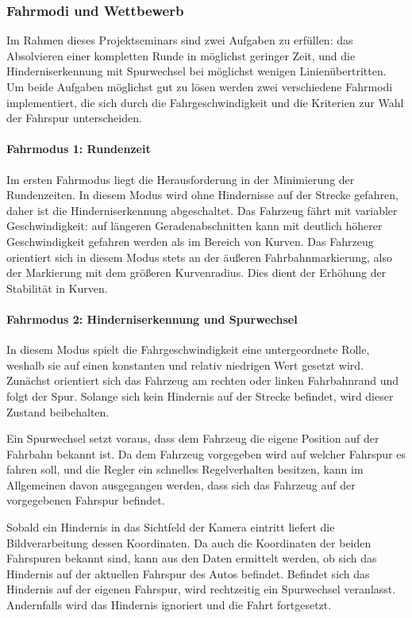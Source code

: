 \subsubsection{Fahrmodi und Wettbewerb}
\label{sec:fahrmodi}
Im Rahmen dieses Projektseminars sind zwei Aufgaben zu erfüllen: das Absolvieren einer kompletten Runde in möglichst geringer Zeit, und die Hinderniserkennung mit Spurwechsel bei möglichst wenigen Linienübertritten. Um beide Aufgaben möglichst gut zu lösen werden zwei verschiedene Fahrmodi implementiert, die sich durch die Fahrgeschwindigkeit und die Kriterien zur Wahl der Fahrspur unterscheiden.

\paragraph{Fahrmodus 1: Rundenzeit}

Im ersten Fahrmodus liegt die Herausforderung in der Minimierung der Rundenzeiten. In diesem Modus wird ohne Hindernisse auf der Strecke gefahren, daher ist die Hinderniserkennung abgeschaltet. Das Fahrzeug fährt mit variabler Geschwindigkeit: auf längeren Geradenabschnitten kann mit deutlich höherer Geschwindigkeit gefahren werden als im Bereich von Kurven. Das Fahrzeug orientiert sich in diesem Modus stets an der äußeren Fahrbahnmarkierung, also der Markierung mit dem größeren Kurvenradius. Dies dient der Erhöhung der Stabilität in Kurven.

\paragraph{Fahrmodus 2: Hinderniserkennung und Spurwechsel}

In diesem Modus spielt die Fahrgeschwindigkeit eine untergeordnete Rolle, weshalb sie auf einen konstanten und relativ niedrigen Wert gesetzt wird. Zunächst orientiert sich das Fahrzeug am rechten oder linken Fahrbahnrand und folgt der Spur. Solange sich kein Hindernis auf der Strecke befindet, wird dieser Zustand beibehalten. 

Ein Spurwechsel setzt voraus, dass dem Fahrzeug die eigene Position auf der Fahrbahn bekannt ist. Da dem Fahrzeug vorgegeben wird auf welcher Fahrspur es fahren soll, und die Regler ein schnelles Regelverhalten besitzen, kann im Allgemeinen davon ausgegangen werden, dass sich das Fahrzeug auf der vorgegebenen Fahrspur befindet.

Sobald ein Hindernis in das Sichtfeld der Kamera eintritt liefert die Bildverarbeitung dessen Koordinaten. Da auch die Koordinaten der beiden Fahrspuren bekannt sind, kann aus den Daten ermittelt werden, ob sich das Hindernis auf der aktuellen Fahrspur des Autos befindet. Befindet sich das Hindernis auf der eigenen Fahrspur, wird rechtzeitig ein Spurwechsel veranlasst. Andernfalls wird das Hindernis ignoriert und die Fahrt fortgesetzt.

